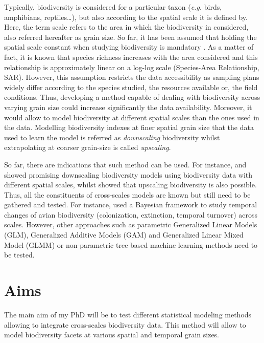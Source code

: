\documentclass[
  12pt,
  oneside]{report}
\begin{document}
Typically, biodiversity is considered for a particular taxon (\emph{e.g.} birds, amphibians, reptiles\ldots), but also
according to the spatial scale it is defined by. Here, the term scale refers to the area in which the
biodiversity in considered, also referred hereafter as grain size. So far, it has been assumed that
holding the spatial scale constant when studying biodiversity is mandatory \autocite{whittaker_scale_2001}. As
a matter of fact, it is known that species richness increases with the area considered \autocite{arrhenius_species_1921} and this relationship is approximately linear on a log-log scale (Species-Area Relationship,
SAR). However, this assumption restricts the data accessibility as sampling plans widely differ
according to the species studied, the resources available or, the field conditions. Thus, developing a
method capable of dealing with biodiversity across varying grain size could increase significantly the
data availability. Moreover, it would allow to model biodiversity at different spatial scales than the
ones used in the data. Modelling biodiversity indexes at finer spatial grain size that the data used to
learn the model is referred as \emph{downscaling} biodiversity whilst extrapolating at coarser grain-size is
called \emph{upscaling}.

So far, there are indications that such method can be used. For instance, \textcite{keil_downscaling_2014} and \textcite{keil_downscaling_2013} showed promising downscaling biodiversity models using biodiversity data with different
spatial scales, whilst \textcite{kunin_upscaling_2018} showed that upscaling biodiversity is also possible. Thus, all
the constituents of cross-scales models are known but still need to be gathered and tested. For
instance, \textcite{jarzyna_spatial_2015} used a Bayesian framework to study temporal changes of avian
biodiversity (colonization, extinction, temporal turnover) across scales. However, other approaches
such as parametric Generalized Linear Models (GLM), Generalized Additive Models (GAM) and
Generalized Linear Mixed Model (GLMM) or non-parametric tree based machine learning methods
need to be tested.

\endgroup

\hypertarget{aims}{%
\chapter{Aims}\label{aims}}

The main aim of my PhD will be to test different statistical modeling methods allowing to integrate
cross-scales biodiversity data. This method will allow to model biodiversity facets at various spatial
and temporal grain sizes.
\end{document}
